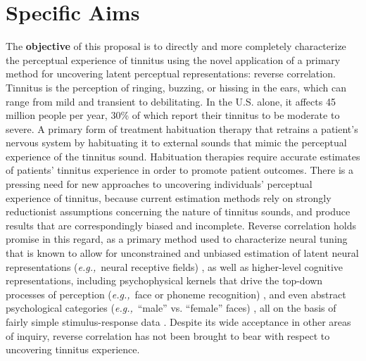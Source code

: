 \documentclass[11pt, notitlepage]{article} %
\def\eg{{\emph{e.g.,}}~}
\begin{document}

\section*{Specific Aims}

The \textbf{objective} of this proposal is to directly and more completely characterize the perceptual experience of tinnitus using the novel application of a primary method for uncovering latent perceptual representations: reverse correlation.
Tinnitus is the perception of ringing, buzzing, or hissing in the ears, which can range from mild and transient to debilitating.
In the U.S. alone, it affects 45 million people per year, 30\% of which report their tinnitus to be moderate to severe.
A primary form of treatment habituation therapy that retrains a patient’s nervous system by habituating it to external sounds that mimic the perceptual experience of the tinnitus sound.
Habituation therapies require accurate estimates of patients’ tinnitus experience in order to promote patient outcomes.
There is a pressing need for new approaches to uncovering individuals’ perceptual experience of tinnitus,
because current estimation methods rely on strongly reductionist assumptions concerning the nature of tinnitus sounds, 
and produce results that are correspondingly biased and incomplete.
Reverse correlation holds promise in this regard,
as a primary method used to characterize neural tuning that is known to allow for unconstrained and unbiased estimation of latent neural representations
(\eg neural receptive fields) \cite{ringachReverseCorrelationNeurophysiology2004, nishimotoReceptiveFieldProperties2006},
as well as higher-level cognitive representations, including psychophysical kernels that drive the top-down processes of perception 
(\eg face or phoneme recognition) \cite{gosselinSuperstitiousPerceptionsReveal2003,smithMeasuringInternalRepresentations2012,neriReceptivePerceptiveFields2006,ahumadaStimulusFeaturesSignal1971},
and even abstract psychological categories (\eg “male” vs. “female” faces)
\cite{brinkmanVisualisingMentalRepresentations2017,manginiMakingIneffableExplicit2004,ponsotCrackingSocialCode2018},
all on the basis of fairly simple stimulus-response data \cite{ljungMeasureLackFit1978,marmarelisWhiteNoiseMethodSystem1978}.
Despite its wide acceptance in other areas of inquiry, reverse correlation has not been brought to bear with respect to uncovering tinnitus experience.
\end{document}
